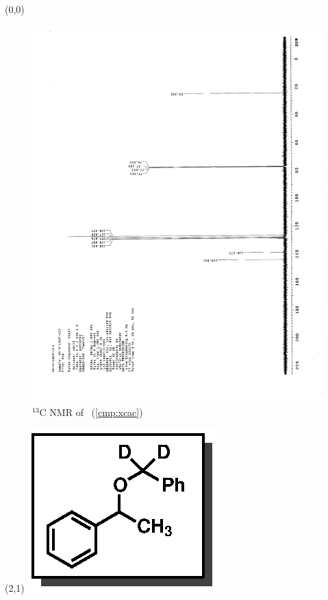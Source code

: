 \clearpage
\begin{textblock}{20}(0,0)
\begin{figure}[htb]
\caption{$^{13}$C NMR of  \CMPxcac\ (\ref{cmp:xcac})}
\includegraphics[scale=0.75, trim = 0mm 0mm 0mm 5mm,
clip]{chp_alkylation/images/nmr/xcacC}
\vspace{-100pt}
\end{figure}
\end{textblock}
\begin{textblock}{1}(2,1)
\includegraphics[scale=0.8, angle=90]{chp_alkylation/images/xcac}
\end{textblock}
\clearpage

